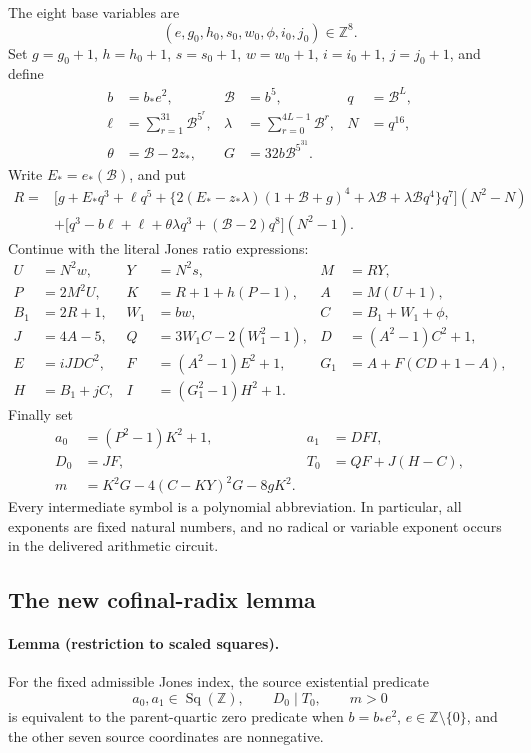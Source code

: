 The eight base variables are
\[
 (e,g_0,h_0,s_0,w_0,\phi,i_0,j_0)\in\mathbb Z^8.
\]
Set \(g=g_0+1\), \(h=h_0+1\), \(s=s_0+1\), \(w=w_0+1\),
\(i=i_0+1\), \(j=j_0+1\), and define
\begin{align*}
 b&=b_*e^2,& \mathcal B&=b^5,&q&=\mathcal B^L,\\
 \ell&=\sum_{r=1}^{31}\mathcal B^{5^r},&
 \lambda&=\sum_{r=0}^{4L-1}\mathcal B^r,&
 N&=q^{16},\\
 \theta&=\mathcal B-2z_*,&
 G&=32b\mathcal B^{5^{31}}.&
\end{align*}
Write \(E_*=e_*(\mathcal B)\), and put
\begin{align*}
 R={}&\bigl[g+E_*q^3+\ell q^5+
 \{2(E_*-z_*\lambda)(1+\mathcal B+g)^4
       +\lambda\mathcal B+\lambda\mathcal Bq^4\}q^7\bigr](N^2-N)\\
 &+\bigl[q^3-b\ell+\ell+\theta\lambda q^3+
              (\mathcal B-2)q^8\bigr](N^2-1).
\end{align*}
Continue with the literal Jones ratio expressions:
\begin{align*}
 U&=N^2w,&Y&=N^2s,&M&=RY,\\
 P&=2M^2U,&K&=R+1+h(P-1),&A&=M(U+1),\\
 B_1&=2R+1,&W_1&=bw,&C&=B_1+W_1+\phi,\\
 J&=4A-5,&Q&=3W_1C-2(W_1^2-1),&D&=(A^2-1)C^2+1,\\
 E&=iJDC^2,&F&=(A^2-1)E^2+1,&G_1&=A+F(CD+1-A),\\
 H&=B_1+jC,&I&=(G_1^2-1)H^2+1.&
\end{align*}
Finally set
\begin{align*}
 a_0&=(P^2-1)K^2+1,&a_1&=DFI,\\
 D_0&=JF,&T_0&=QF+J(H-C),\\
 m&=K^2G-4(C-KY)^2G-8gK^2.&
\end{align*}
Every intermediate symbol is a polynomial abbreviation.  In particular,
all exponents are fixed natural numbers, and no radical or variable
exponent occurs in the delivered arithmetic circuit.

\subsection{The new cofinal-radix lemma}

\paragraph{Lemma (restriction to scaled squares).}
For the fixed admissible Jones index, the source existential predicate
\[
 a_0,a_1\in\operatorname{Sq}(\mathbb Z),\qquad
 D_0\mid T_0,\qquad m>0
 \tag{JR}\label{eq:JR16}
\]
is equivalent to the parent-quartic zero predicate when
\(b=b_*e^2\), \(e\in\mathbb Z\setminus\{0\}\), and the other
seven source coordinates are nonnegative.

